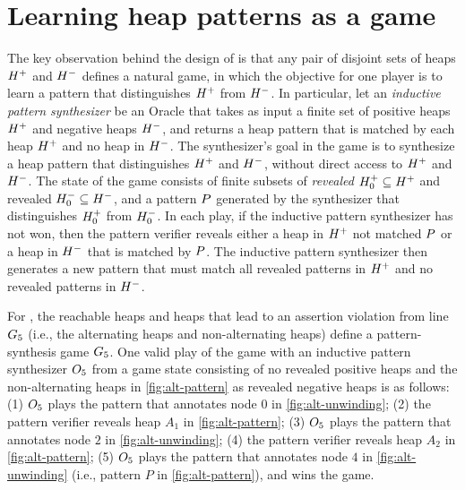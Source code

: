 \section{Learning heap patterns as a game}
\label{sec:ex-heap-games}
The key observation behind the design of \verifier is that any pair of
disjoint sets of heaps $H^{+}$ and $H^{-}$ defines a natural
game, in which the objective for one player is to learn a pattern that
distinguishes $H^{+}$ from $H^{-}$.
In particular, let an \emph{inductive pattern synthesizer} be an
Oracle that takes as input a finite set of positive heaps $H^{+}$
and negative heaps $H^{-}$, and returns a heap pattern that is
matched by each heap $H^{+}$ and no heap in $H^{-}$.
%
The synthesizer's goal in the game is to synthesize a heap pattern
that distinguishes $H^{+}$ and $H^{-}$, without direct access
to $H^{+}$ and $H^{-}$.
%
The state of the game consists of finite subsets of \emph{revealed}
$H^{+}_0 \subseteq H^{+}$ and revealed $H^{-}_0 \subseteq
H^{-}$, and a pattern $P$ generated by the synthesizer that
distinguishes $H^{+}_0$ from $H^{-}_0$.
%
In each play, if the inductive pattern synthesizer has not won, then
the pattern verifier reveals either a heap in $H^{+}$ not matched
$P$ or a heap in $H^{-}$ that is matched by $P$.
%
The inductive pattern synthesizer then generates a new pattern that
must match all revealed patterns in $H^{+}$ and no revealed
patterns in $H^{-}$.
\begin{ex}
  \label{ex:alt-list-game}
  For \altlist, the reachable heaps and heaps that lead to an
  assertion violation from line $G_5$ (i.e., the alternating
  heaps and non-alternating heaps) define a pattern-synthesis game
  $G_5$.
  One valid play of the game with an inductive pattern synthesizer
  $O_5$ from a game state consisting of no revealed positive
  heaps and the non-alternating heaps in \autoref{fig:alt-pattern} as
  revealed negative heaps is as follows:
  (1) $O_5$ plays the pattern that annotates node $0$ in
  \autoref{fig:alt-unwinding};
  (2) the pattern verifier reveals heap $A_1$ in
  \autoref{fig:alt-pattern};
  (3) $O_5$ plays the pattern that annotates node $2$ in
  \autoref{fig:alt-unwinding};
  (4) the pattern verifier reveals heap $A_2$ in
  \autoref{fig:alt-pattern};
  (5) $O_5$ plays the pattern that annotates node $4$ in
  \autoref{fig:alt-unwinding} (i.e., pattern $P$ in
  \autoref{fig:alt-pattern}), and wins the game.
\end{ex}


